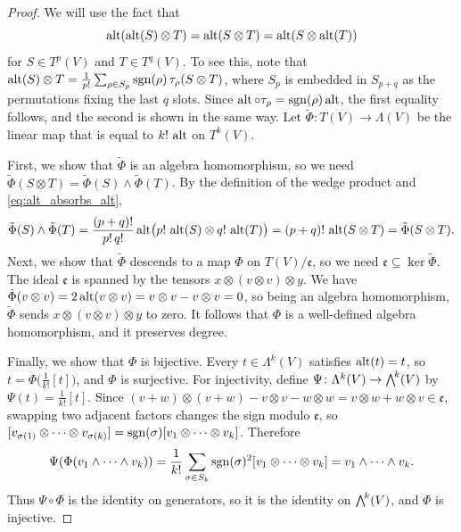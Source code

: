 \documentclass[a4paper,12pt]{article}
\begin{document}
\begin{proof}
    We will use the fact that
    \begin{equation}\label{eq:alt_absorbs_alt}
        \operatorname{alt}(\operatorname{alt}(S) \otimes T) = \operatorname{alt}(S \otimes T) = \operatorname{alt}(S \otimes \operatorname{alt}(T))
    \end{equation}
    for $S \in T^p(V)$ and $T \in T^q(V)$.
    To see this, note that $\operatorname{alt}(S) \otimes T = \frac{1}{p!} \sum_{\rho \in S_p} \operatorname{sgn}(\rho) \, \tau_\rho(S \otimes T)$, where $S_p$ is embedded in $S_{p+q}$ as the permutations fixing the last $q$ slots.
    Since $\operatorname{alt} \circ \tau_\rho = \operatorname{sgn}(\rho) \operatorname{alt}$, the first equality follows, and the second is shown in the same way.
    Let $\tilde{\Phi} \colon T(V) \to \Lambda(V)$ be the linear map that is equal to $k! \, \operatorname{alt}$ on $T^k(V)$.

    First, we show that $\tilde{\Phi}$ is an algebra homomorphism, so we need $\tilde{\Phi}(S \otimes T) = \tilde{\Phi}(S) \wedge \tilde{\Phi}(T)$.
    By the definition of the wedge product and \eqref{eq:alt_absorbs_alt},
    \begin{equation*}
        \tilde{\Phi}(S) \wedge \tilde{\Phi}(T) = \frac{(p+q)!}{p!\,q!} \operatorname{alt}\bigl(p! \, \operatorname{alt}(S) \otimes q! \, \operatorname{alt}(T)\bigr) = (p+q)! \, \operatorname{alt}(S \otimes T) = \tilde{\Phi}(S \otimes T).
    \end{equation*}
    Next, we show that $\tilde{\Phi}$ descends to a map $\Phi$ on $T(V) / \mathfrak{e}$, so we need $\mathfrak{e} \subseteq \ker \tilde{\Phi}$.
    The ideal $\mathfrak{e}$ is spanned by the tensors $x \otimes (v \otimes v) \otimes y$.
    We have $\tilde{\Phi}(v \otimes v) = 2 \operatorname{alt}(v \otimes v) = v \otimes v - v \otimes v = 0$, so being an algebra homomorphism, $\tilde{\Phi}$ sends $x \otimes (v \otimes v) \otimes y$ to zero.
    It follows that $\Phi$ is a well-defined algebra homomorphism, and it preserves degree.

    Finally, we show that $\Phi$ is bijective.
    Every $t \in \Lambda^k(V)$ satisfies $\operatorname{alt}(t) = t$, so $t = \Phi\bigl(\tfrac{1}{k!}[t]\bigr)$, and $\Phi$ is surjective.
    For injectivity, define $\Psi \colon \Lambda^k(V) \to \extp^k(V)$ by $\Psi(t) = \frac{1}{k!}[t]$.
    Since $(v + w) \otimes (v + w) - v \otimes v - w \otimes w = v \otimes w + w \otimes v \in \mathfrak{e}$, swapping two adjacent factors changes the sign modulo $\mathfrak{e}$, so $[v_{\sigma(1)} \otimes \cdots \otimes v_{\sigma(k)}] = \operatorname{sgn}(\sigma) [v_1 \otimes \cdots \otimes v_k]$.
    Therefore
    \begin{equation*}
        \Psi(\Phi(v_1 \wedge \cdots \wedge v_k)) = \frac{1}{k!} \sum_{\sigma \in S_k} \operatorname{sgn}(\sigma)^2 [v_1 \otimes \cdots \otimes v_k] = v_1 \wedge \cdots \wedge v_k.
    \end{equation*}
    Thus $\Psi \circ \Phi$ is the identity on generators, so it is the identity on $\extp^k(V)$, and $\Phi$ is injective. \qedhere
\end{proof}
\end{document}
